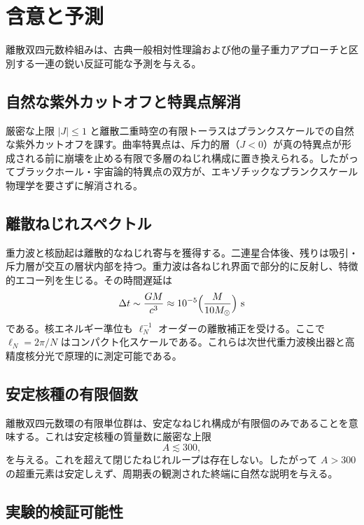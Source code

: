 \documentclass[a4paper]{article}
\theoremstyle{definition}
\begin{document}
\section{含意と予測}

離散双四元数枠組みは、古典一般相対性理論および他の量子重力アプローチと区別する一連の鋭い反証可能な予測を与える。

\subsection{自然な紫外カットオフと特異点解消}

厳密な上限 $|J| \leq 1$ と離散二重時空の有限トーラスはプランクスケールでの自然な紫外カットオフを課す。曲率特異点は、斥力的層（$J < 0$）が真の特異点が形成される前に崩壊を止める有限で多層のねじれ構成に置き換えられる。したがってブラックホール・宇宙論的特異点の双方が、エキゾチックなプランクスケール物理学を要さずに解消される。

\subsection{離散ねじれスペクトル}

重力波と核励起は離散的なねじれ寄与を獲得する。二連星合体後、残りは吸引・斥力層が交互の層状内部を持つ。重力波は各ねじれ界面で部分的に反射し、特徴的エコー列を生じる。その時間遅延は
\[
\Delta t \sim \frac{GM}{c^3} \approx 10^{-5} \Bigl( \frac{M}{10 M_\odot} \Bigr) \text{ s}
\]
である。核エネルギー準位も $\ell_N^{-1}$ オーダーの離散補正を受ける。ここで $\ell_N = 2\pi / N$ はコンパクト化スケールである。これらは次世代重力波検出器と高精度核分光で原理的に測定可能である。

\subsection{安定核種の有限個数}

離散双四元数環の有限単位群は、安定なねじれ構成が有限個のみであることを意味する。これは安定核種の質量数に厳密な上限
\[
A \lesssim 300,
\]
を与える。これを超えて閉じたねじれループは存在しない。したがって $A > 300$ の超重元素は安定しえず、周期表の観測された終端に自然な説明を与える。

\subsection{実験的検証可能性}
\end{document}
